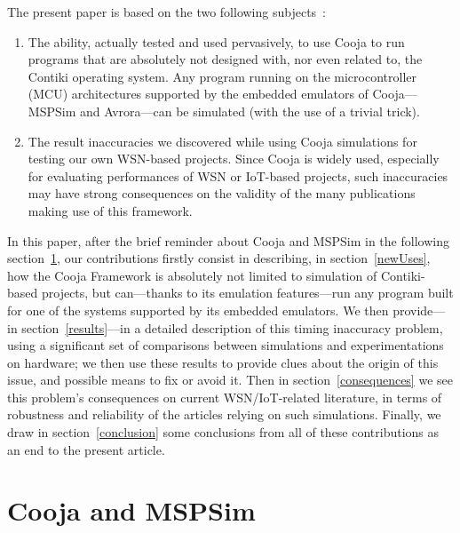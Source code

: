 \documentclass[10pt]{ewsn-proc}
\begin{document}
\medskip

The present paper is based on the two following subjects~:
\begin{enumerate}

\item The ability, actually tested and used pervasively, to use Cooja
to run programs that are absolutely not designed with, nor even related to,
the Contiki operating system. Any program running on the microcontroller
(MCU) architectures supported by the embedded emulators of Cooja---MSPSim
and Avrora---can be simulated (with the use of a trivial trick).

\item The result inaccuracies we discovered while using Cooja simulations
for testing our own WSN-based projects. Since Cooja is widely used,
especially for evaluating performances of WSN or IoT-based projects,
such inaccuracies may have strong consequences on the validity of
the many publications making use of this framework.

\end{enumerate}

\bigskip

In this paper, after the brief reminder about Cooja and MSPSim in the
following section~\ref{coojaMspsim}, our contributions firstly consist in
describing, in section~\ref{newUses}, how the Cooja Framework is absolutely
not limited to simulation of Contiki-based projects, but can---thanks to
its emulation features---run any program built for one of the systems
supported by its embedded emulators.
We then provide---in section~\ref{results}---in a detailed description
of this timing inaccuracy problem, using a significant set of comparisons
between simulations and experimentations on hardware; we then use
these results to provide clues about the origin of this issue, and
possible means to fix or avoid it.
Then in section~\ref{consequences} we see this problem's consequences
on current WSN/IoT-related literature, in terms of robustness and
reliability of the articles relying on such simulations.
Finally, we draw in section~\ref{conclusion} some conclusions from all
of these contributions as an end to the present article.



\section{Cooja and MSPSim}
\label{coojaMspsim}
\end{document}
